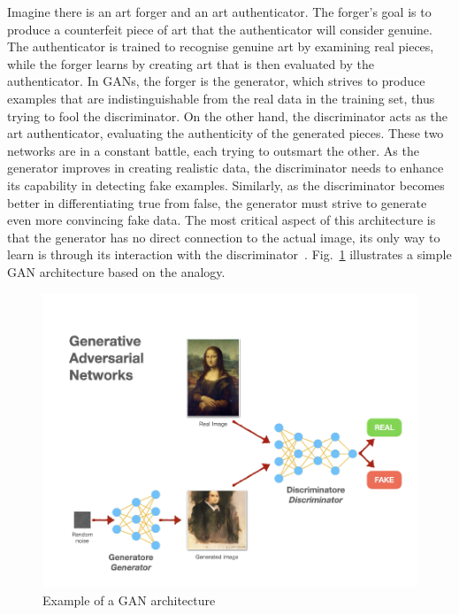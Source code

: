 Imagine there is an art forger and an art authenticator. The forger's goal is to produce a counterfeit piece of art that the authenticator will consider genuine. The authenticator is trained to recognise genuine art by examining real pieces, while the forger learns by creating art that is then evaluated by the authenticator. In GANs, the forger is the generator, which strives to produce examples that are indistinguishable from the real data in the training set, thus trying to fool the discriminator. On the other hand, the discriminator acts as the art authenticator, evaluating the authenticity of the generated pieces. These two networks are in a constant battle, each trying to outsmart the other. As the generator improves in creating realistic data, the discriminator needs to enhance its capability in detecting fake examples. Similarly, as the discriminator becomes better in differentiating true from false, the generator must strive to generate even more convincing fake data. The most critical aspect of this architecture is that the generator has no direct connection to the actual image, its only way to learn is through its interaction with the discriminator~\cite{GeneratingNewRealityBook}. Fig.~\ref{fig:GAN architecture} illustrates a simple GAN architecture based on the analogy.
\begin{figure}[h!]
\centering
  \includegraphics[scale=0.5]{figures/GANs-ex-art.png}
  \caption{Example of a GAN architecture}
  \label{fig:GAN architecture}
\end{figure}

